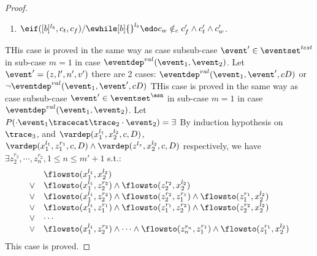 {\begin{proof}
\begin{enumerate}
 By definition of environment, we have:
\[
  \forall u \in \lvar_c \setminus \{x_1^{l_1}\} \st
  \env(\vtrace_0 \vtrace_1 \cdot \event_1') (u) =  
  \env(\vtrace_0 \vtrace_1 \cdot \event_1) (u)
\]
%
By {Inversion Lemma~\ref{lem:inv_b}} of boolean expression evaluation on $b'$, we have:
 \[
  x_1 \in VAR(b')
 \]
 We also have 
 $$
 \llabel(\vtrace_0 \vtrace_1 \cdot \event_1') x_1 = l_1
 \land 
 \llabel(\vtrace_0 \vtrace_1 \cdot \event_1') x_1 = l_1
 $$
 Then, we know:
 \[
 \flowsto(x_1^{l_1}, x_2^{l2})
 \]
 This case is proved.
\item $\eif([b]{}^{l_b}, c_t, c_f) / \ewhile [b]{}^{l_b} \edo c_w \notin_c c_f' \land c_t' \land c_w'$.

\end{enumerate}
%
THis case is proved in the same way as case subsub-case $\event' \in \eventset^{test}$ in sub-case $m = 1$ in case $\eventdep^{val}(\event_1, \event_2)$.
%
Let $\event' = (z, l', n', v')$  there are 2 cases:
$\eventdep^{val}(\event_1, \event', c D)$ or $\neg \eventdep^{val}(\event_1, \event', c D)$
%
%
THis case is proved in the same way as case subsub-case $\event' \in \eventset^{\asn}$ in sub-case $m = 1$ in case $\eventdep^{val}(\event_1, \event_2)$.
%
Let $P(\cdot \event_1 \tracecat \trace_2 \cdot \event_2) = \exists$
By induction hypothesis on $\trace_3$,
 and $\vardep(x_1^{l_1}, x_2^{l_2}, c, D)$, 
$\vardep(x_1^{l_1}, z_1^{r_1}, c, D) \land \vardep(z^{l_z}, x_2^{l_2}, c, D)$ respectively, 
we have $\exists z_2^{r_2}, \cdots, z_n^{r_2}, 1 \leq n \leq m'+1$ s.t.:
\[
\begin{array}{ll}
      & \flowsto(x_1^{l_1}, x_2^{l_2}) \\
  \lor  & \flowsto(x_1^{l_1}, z_2^{r_2}) \land \flowsto(z_2^{r_2}, x_2^{l_2})\\
  \lor  & \flowsto(x_1^{l_1}, z_2^{r_2}) \land \flowsto(z_2^{r_2}, z_1^{r_1}) \land \flowsto(z_1^{r_1}, x_2^{l_2}) \\
  \lor  & \flowsto(x_1^{l_1}, z_1^{r_1}) \land \flowsto(z_1^{r_1}, z_2^{r_2}) \land \flowsto(z_2^{r_2}, x_2^{l_2}) \\
  \lor  & \cdots \\
  \lor  & \flowsto(x_1^{l_1}, z_2^{r_2}) \land \cdots \land \flowsto(z_n^{r_n}, z_1^{r_1}) \land \flowsto(z_1^{r_1}, x_2^{l_2}) \\
\end{array}
\]This case is proved.
\end{proof}}